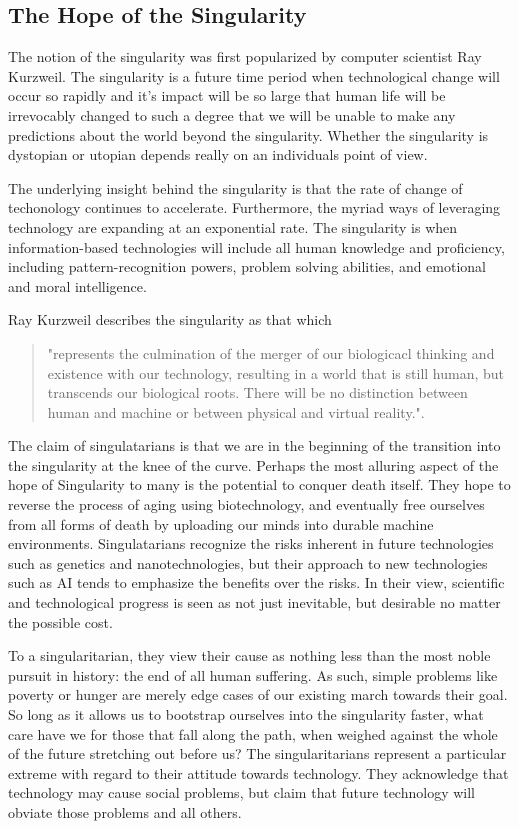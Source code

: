 \subsection{The Hope of the Singularity}
\label{sec:-singularity}
 The notion of the singularity was first popularized by computer 
scientist Ray Kurzweil. The singularity is a future time period when 
technological change will occur so rapidly and it's impact will be so 
large that human life will be irrevocably changed to such a degree that
we will be unable to make any predictions about the world beyond the 
singularity. Whether the singularity is dystopian or utopian depends 
really on an individuals point of view. 

The underlying insight behind the singularity is that the rate of 
change of techonology continues to accelerate. Furthermore, the myriad 
ways of leveraging technology are expanding at an exponential rate. The 
singularity is when information-based technologies will include all 
human knowledge and proficiency, including pattern-recognition powers, 
problem solving abilities, and emotional and moral intelligence. 

Ray Kurzweil describes the singularity as that which 
\begin{quotation}\small 
  "represents the culmination of the merger of our biologicacl thinking 
  and existence with our technology, resulting in a world that is still 
  human, but transcends our biological roots. There will be no distinction 
  between human and machine or between physical and virtual 
  reality."\cite{kurzweil2005singularity}. 
\end{quotation}

The claim of singulatarians is that we are in the beginning of the 
transition into the singularity at the knee of the curve. Perhaps the 
most alluring aspect of the hope of Singularity to many is the potential 
to conquer death itself.  They hope to reverse the process of aging using 
biotechnology, and eventually free ourselves from all forms of death 
by uploading our minds into durable machine environments. Singulatarians 
recognize the risks inherent in future technologies such as genetics and 
nanotechnologies, but their approach to new technologies such as AI 
tends to emphasize the benefits over the risks. In their view, scientific 
and technological progress is seen as not just inevitable, but desirable no 
matter the possible cost. 

To a singularitarian, they view their cause as 
nothing less than the most noble pursuit in history: the end of 
all human suffering.  As such, simple problems like poverty or hunger 
are merely edge cases of our existing march towards their goal.  So 
long as it allows us to bootstrap ourselves into the singularity 
faster, what care have we for those that fall along the path, when 
weighed against the whole of the future stretching out before us?  
The singularitarians represent a particular extreme with regard to 
their attitude towards technology.  They acknowledge that technology 
may cause social problems, but claim that future technology will obviate 
those problems and all others.  
  

  

